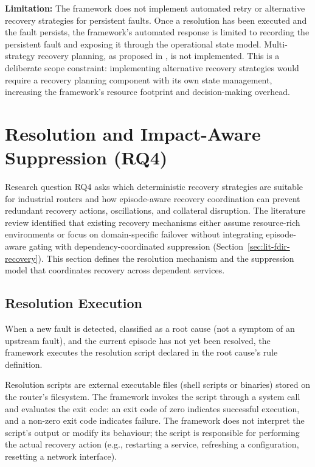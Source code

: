 \textbf{Limitation:} The framework does not implement automated retry or alternative recovery strategies for persistent faults. Once a resolution has been executed and the fault persists, the framework's automated response is limited to recording the persistent fault and exposing it through the operational state model. Multi-strategy recovery planning, as proposed in \cite{ref19}, is not implemented. This is a deliberate scope constraint: implementing alternative recovery strategies would require a recovery planning component with its own state management, increasing the framework's resource footprint and decision-making overhead.

\section{Resolution and Impact-Aware Suppression (RQ4)}\label{sec:resolution-suppression}

Research question RQ4 asks which deterministic recovery strategies are suitable for industrial routers and how episode-aware recovery coordination can prevent redundant recovery actions, oscillations, and collateral disruption. The literature review identified that existing recovery mechanisms either assume resource-rich environments \cite{ref17,ref19,ref22} or focus on domain-specific failover \cite{ref23,ref24,ref25} without integrating episode-aware gating with dependency-coordinated suppression (Section~\ref{sec:lit-fdir-recovery}). This section defines the resolution mechanism and the suppression model that coordinates recovery across dependent services.

\subsection{Resolution Execution}\label{sec:resolution-execution}

When a new fault is detected, classified as a root cause (not a symptom of an upstream fault), and the current episode has not yet been resolved, the framework executes the resolution script declared in the root cause's rule definition.

Resolution scripts are external executable files (shell scripts or binaries) stored on the router's filesystem. The framework invokes the script through a system call and evaluates the exit code: an exit code of zero indicates successful execution, and a non-zero exit code indicates failure. The framework does not interpret the script's output or modify its behaviour; the script is responsible for performing the actual recovery action (e.g., restarting a service, refreshing a configuration, resetting a network interface).

